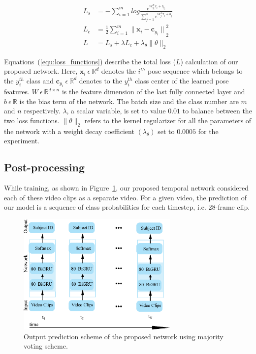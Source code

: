 \begin{equation} \label{equ:loss_functions}
\begin{split}
L_s &=-\sum_{i=1}^{m}log{\frac{e^{W_{y_i}^{T}x_i + b_{y_i}}}{\sum_{j=1}^{n}{e^{W_{j}^{T}x_i+ b_j}}}} \\
L_c &= \frac{1}{2}\sum_{i=1}^{m}{\parallel{{\boldsymbol x_i}-{\boldsymbol c_{y_i}}}\parallel}_2^2 \\
L &= L_s + \lambda L_c + \lambda_{\theta}\parallel{\theta}\parallel_{2}
\end{split} 
\end{equation}

Equations~(\ref{equ:loss_functions}) describe the total loss ($ L $) calculation of our proposed network. Here, $\boldsymbol x_{i}~\epsilon~\mathbb {R}^d$ denotes the $i^{th}$ pose sequence which belongs to the $y_i^{th}$ class and  $\boldsymbol c_{y_i}~\epsilon~\mathbb {R}^d$ denotes to the $y_i^{th}$ class center of the learned pose features. $W~\epsilon~\mathbb {R}^{d\times n}$ is the feature dimension of the last fully connected layer and $b~\epsilon~\mathbb {R}$ is the bias term of the network. The batch size and the class number are $ m $ and $ n $ respectively. $\lambda$, a scalar variable, is set to value $ 0.01 $ to balance between the two loss functions. $\parallel{\theta}\parallel_{2}$ refers to the kernel regularizer for all the parameters of the network with a weight decay coefficient $(\lambda_{\theta})$ set to $0.0005$ for the experiment.  


\subsection{Post-processing}\label{subsec_post_process}
While training, as shown in Figure~\ref{fig:output_prediction}, our proposed temporal network considered each of these video clips as a separate video. For a given video, the prediction of our model is a sequence of class probabilities for each timestep, i.e. 28-frame clip.

\begin{figure}
	\centering
	\includegraphics[width=0.7\textwidth ]{figures/output_prediction.eps}
	\caption[Output prediction scheme of our proposed network]{
		Output prediction scheme of the proposed network using majority voting scheme.
	}
	\label{fig:output_prediction}
\end{figure}

